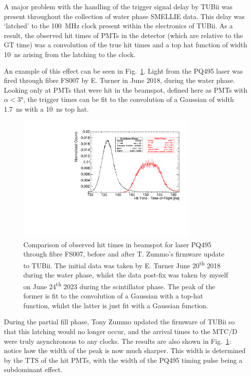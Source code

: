 A major problem with the handling of the trigger signal delay by TUBii was present throughout the collection of water phase SMELLIE data. This delay was `latched' to the \SI{100}{\MHz} clock present within the electronics of TUBii. As a result, the observed hit times of PMTs in the detector (which are relative to the GT time) was a convolution of the true hit times and a top hat function of width \SI{10}{\ns} arising from the latching to the clock.

An example of this effect can be seen in Fig.~\ref{fig:smellie_beam_tres_tubii_comparison}. Light from the PQ495 laser was fired through fibre FS007 by E. Turner in June 2018, during the water phase. Looking only at PMTs that were hit in the beamspot, defined here as PMTs with $\alpha<\ang{3}$, the trigger times can be fit to the convolution of a Gaussian of width \SI{1.7}{\ns} with a \SI{10}{\ns} top hat.

\begin{figure}
    \centering
    \includegraphics[width=0.8\textwidth]{3_SMELLIEHardware/images/time_plots_comparison_114018_vs_302634_FS007_nice.pdf}
    \caption[Comparison of observed hit times in beamspot before and after TUBii firmware update]
    {Comparison of observed hit times in beamspot for laser PQ495 through fibre FS007, before and after T. Zummo's firmware update to TUBii. The initial data was taken by E. Turner June 20\textsuperscript{th} 2018 during the water phase, whilst the data post-fix was taken by myself on June 24\textsuperscript{th} 2023 during the scintillator phase. The peak of the former is fit to the convolution of a Gaussian with a top-hat function, whilst the latter is just fit with a Gaussian function.}
    \label{fig:smellie_beam_tres_tubii_comparison}
\end{figure}

During the partial fill phase, Tony Zummo updated the firmware of TUBii so that this latching would no longer occur, and the arrival times to the MTC/D were truly asynchronous to any clocks. The results are also shown in Fig.~\ref{fig:smellie_beam_tres_tubii_comparison}: notice how the width of the peak is now much sharper. This width is determined by the TTS of the hit PMTs, with the width of the PQ495 timing pulse being a subdominant effect.


